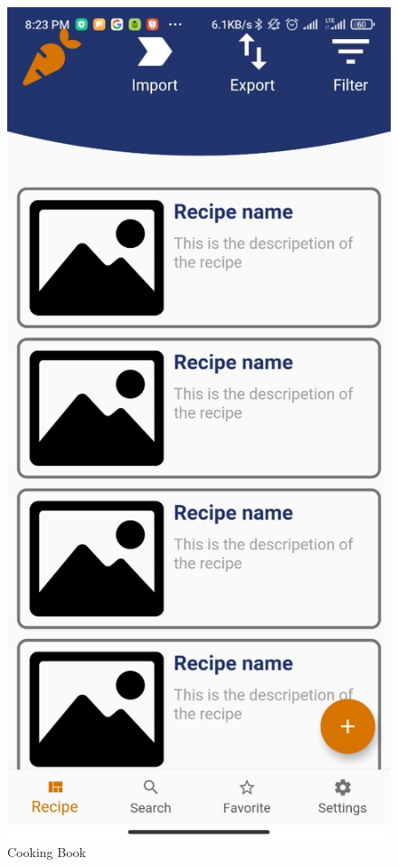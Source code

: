 \documentclass{article}
\begin{document}
\begin{figure}[h!]
\centering
\includegraphics[scale=0.1]{Images/CookingBook.jpg}
\caption{Cooking Book}
\label{fig:cookingbook}
\end{figure}
\end{document}
